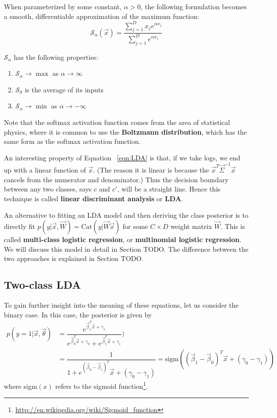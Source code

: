 When parameterized by some constant, $\alpha > 0$, the following formulation becomes a smooth, differentiable approximation of the maximum function:
\begin{equation}
\mathcal{S}_{\alpha}(\vec{x}) = \dfrac{\sum_{j=1}^D x_je^{\alpha x_j}}{\sum_{j=1}^D e^{\alpha x_j}}
\end{equation}

$\mathcal{S}_{\alpha}$ has the following properties:
\begin{enumerate}
\item $\mathcal{S}_{\alpha} \rightarrow \max$ as $\alpha \rightarrow \infty$
\item $\mathcal{S}_0$ is the average of its inputs
\item $\mathcal{S}_{\alpha} \rightarrow \min$ as $\alpha \rightarrow -\infty$
\end{enumerate}

Note that the softmax activation function comes from the area of statistical physics, where it is common to use the \textbf{Boltzmann distribution}, which has the same form as the softmax activation function.

An interesting property of Equation ~\eqref{eqn:LDA} is that, if we take logs, we end up with a linear function of $\vec{x}$. (The reason it is linear is because the $\vec{x}^T\vec{\Sigma}^{-1}\vec{x}$ cancels from the numerator and denominator.) Thus the decision boundary between any two classes, says $c$ and $c'$, will be a straight line. Hence this technique is called \textbf{linear discriminant analysis} or \textbf{LDA}.

An alternative to fitting an LDA model and then deriving the class posterior is to directly fit $p(y|\vec{x},\vec{W})=\text{Cat}(y|\vec{W}\vec{x})$ for some $C \times D$ weight matrix $\vec{W}$. This is called \textbf{multi-class logistic regression}, or \textbf{multinomial logistic regression}. We will discuss this model in detail in Section TODO. The difference between the two approaches is explained in Section TODO.


\subsection{Two-class LDA}
To gain further insight into the meaning of these equations, let us consider the binary case. In this case, the posterior is given by
\begin{align}
p(y=1|\vec{x},\vec{\theta})& =\dfrac{e^{\vec{\beta}_1^T\vec{x}+\gamma_1}}{e^{\vec{\beta}_0^T\vec{x}+\gamma_0}+e^{\vec{\beta}_1^T\vec{x}+\gamma_1}}) \\
  & =\dfrac{1}{1+e^(\vec{\beta}_0-\vec{\beta}_1)^T\vec{x}+(\gamma_0-\gamma_1)}=\text{sigm}((\vec{\beta}_1-\vec{\beta}_0)^T\vec{x}+(\gamma_0-\gamma_1))
\end{align}
where sigm$(x)$ refers to the sigmoid function\footnote{\url{http://en.wikipedia.org/wiki/Sigmoid_function}}.

